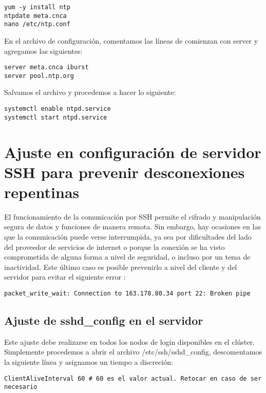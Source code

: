 \begin{lstlisting} 
yum -y install ntp
ntpdate meta.cnca
nano /etc/ntp.conf
\end{lstlisting}

En el archivo de configuración, comentamos las líneas de comienzan con server y agregamos las siguientes:

\begin{lstlisting} 
server meta.cnca iburst
server pool.ntp.org
\end{lstlisting}

Salvamos el archivo y procedemos a hacer lo siguiente:

\begin{lstlisting} 
systemctl enable ntpd.service
systemctl start ntpd.service
\end{lstlisting}

\section{Ajuste en configuración de servidor SSH para prevenir desconexiones repentinas}
El funcionamiento de la comunicación por SSH permite el cifrado y manipulación segura de datos y funciones de manera remota. Sin embargo, hay ocasiones en las que la comunicación puede verse interrumpida, ya sea por dificultades del lado del proveedor de servicios de internet o porque la conexión se ha visto comprometida de alguna forma a nivel de seguridad, o incluso por un tema de inactividad. Este último caso es posible prevenirlo a nivel del cliente y del servidor para evitar el siguiente error \cite{brokenpipe}:

\begin{lstlisting} 
packet_write_wait: Connection to 163.178.80.34 port 22: Broken pipe
\end{lstlisting}

\subsection{Ajuste de sshd\_config en el servidor}
Este ajuste debe realizarse en todos los nodos de login disponibles en el clúster. Simplemente procedemos a abrir el archivo /etc/ssh/sshd\_config, descomentamos la siguiente línea y asignamos un tiempo a discreción:

\begin{lstlisting} 
ClientAliveInterval 60 # 60 es el valor actual. Retocar en caso de ser necesario
\end{lstlisting}


